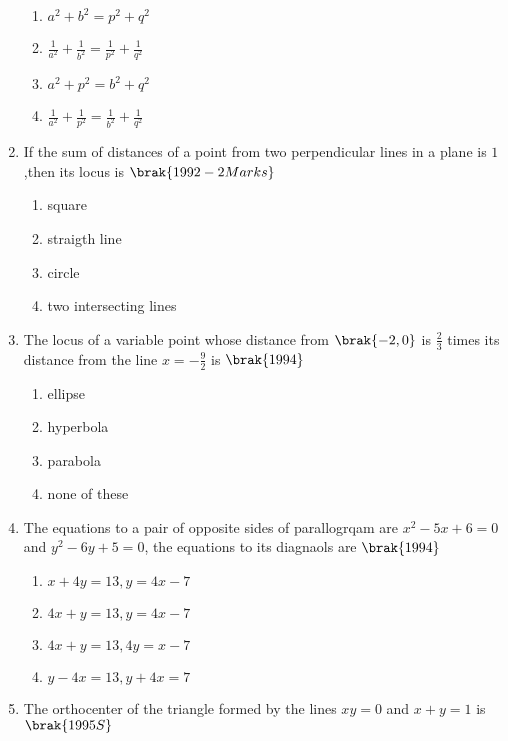 \begin{enumerate}
\begin{enumerate}
    \item $a^2+b^2=p^2+q^2$
    \item $\frac{1}{a^2}+\frac{1}{b^2}=\frac{1}{p^2}+\frac{1}{q^2}$
    \item $a^2+p^2=b^2+q^2$
    \item $\frac{1}{a^2}+\frac{1}{p^2}=\frac{1}{b^2}+\frac{1}{q^2}$
    
\end{enumerate}
\item If the sum of distances of a point from two perpendicular lines in a plane is $1$,then its locus is
\hfill{$\brak{1992-2 Marks}$}
\begin{enumerate}
    
        \item square
        \item straigth line
        \item circle
        \item two intersecting lines
    
\end{enumerate}
\item The locus of a variable point whose distance from $\brak{-2,0}$ is $\frac{2}{3}$ times its distance from the line $x=-\frac{9}{2}$ is
\hfill{$\brak{1994}$}
\begin{enumerate}
    
       \item ellipse
       \item hyperbola
       \item parabola
       \item none of these
    
\end{enumerate}
\item The equations to a pair of opposite sides of parallogrqam are $x^2-5x+6=0$ and $y^2-6y+5=0$, the equations to its diagnaols are 
\hfill{$\brak{1994}$}
\begin{enumerate}
    
      \item $x+4y=13,y=4x-7$
    \item $4x+y=13,y=4x-7$
      \item $4x+y=13,4y=x-7$
        \item $y-4x=13,y+4x=7$
    
\end{enumerate}
\item The orthocenter of the triangle formed by the lines $xy=0$ and $x+y=1$ is 
\hfill{$\brak{1995S}$}
\begin{enumerate}
    

\end{enumerate}
\end{enumerate}
